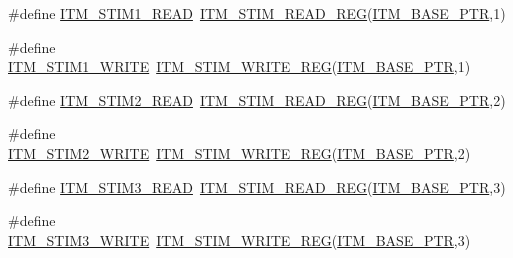 \begin{DoxyCompactItemize}
\item 
\#define \hyperlink{group___i_t_m___register___accessor___macros_ga0539c5b663891628a5157b9e06be3327}{I\+T\+M\+\_\+\+S\+T\+I\+M1\+\_\+\+R\+E\+AD}~\hyperlink{group___i_t_m___register___accessor___macros_ga5009882336aadcd4f37b45cf3395c450}{I\+T\+M\+\_\+\+S\+T\+I\+M\+\_\+\+R\+E\+A\+D\+\_\+\+R\+EG}(\hyperlink{group___i_t_m___peripheral_gafaddee8fe8b6a898d4e5edc43ee0d703}{I\+T\+M\+\_\+\+B\+A\+S\+E\+\_\+\+P\+TR},1)
\item 
\#define \hyperlink{group___i_t_m___register___accessor___macros_gadb4269a2c1aae622c11d8e38853bf0d3}{I\+T\+M\+\_\+\+S\+T\+I\+M1\+\_\+\+W\+R\+I\+TE}~\hyperlink{group___i_t_m___register___accessor___macros_ga049ca92a4e78e77c19af81e51aa73f1c}{I\+T\+M\+\_\+\+S\+T\+I\+M\+\_\+\+W\+R\+I\+T\+E\+\_\+\+R\+EG}(\hyperlink{group___i_t_m___peripheral_gafaddee8fe8b6a898d4e5edc43ee0d703}{I\+T\+M\+\_\+\+B\+A\+S\+E\+\_\+\+P\+TR},1)
\item 
\#define \hyperlink{group___i_t_m___register___accessor___macros_ga34d8d4f75c9b1761c099b65fc7b2073e}{I\+T\+M\+\_\+\+S\+T\+I\+M2\+\_\+\+R\+E\+AD}~\hyperlink{group___i_t_m___register___accessor___macros_ga5009882336aadcd4f37b45cf3395c450}{I\+T\+M\+\_\+\+S\+T\+I\+M\+\_\+\+R\+E\+A\+D\+\_\+\+R\+EG}(\hyperlink{group___i_t_m___peripheral_gafaddee8fe8b6a898d4e5edc43ee0d703}{I\+T\+M\+\_\+\+B\+A\+S\+E\+\_\+\+P\+TR},2)
\item 
\#define \hyperlink{group___i_t_m___register___accessor___macros_gaef5fd73197cf69307c400cd33e9d5c0a}{I\+T\+M\+\_\+\+S\+T\+I\+M2\+\_\+\+W\+R\+I\+TE}~\hyperlink{group___i_t_m___register___accessor___macros_ga049ca92a4e78e77c19af81e51aa73f1c}{I\+T\+M\+\_\+\+S\+T\+I\+M\+\_\+\+W\+R\+I\+T\+E\+\_\+\+R\+EG}(\hyperlink{group___i_t_m___peripheral_gafaddee8fe8b6a898d4e5edc43ee0d703}{I\+T\+M\+\_\+\+B\+A\+S\+E\+\_\+\+P\+TR},2)
\item 
\#define \hyperlink{group___i_t_m___register___accessor___macros_gac2585aa635223db51bc5dfb64d5901f0}{I\+T\+M\+\_\+\+S\+T\+I\+M3\+\_\+\+R\+E\+AD}~\hyperlink{group___i_t_m___register___accessor___macros_ga5009882336aadcd4f37b45cf3395c450}{I\+T\+M\+\_\+\+S\+T\+I\+M\+\_\+\+R\+E\+A\+D\+\_\+\+R\+EG}(\hyperlink{group___i_t_m___peripheral_gafaddee8fe8b6a898d4e5edc43ee0d703}{I\+T\+M\+\_\+\+B\+A\+S\+E\+\_\+\+P\+TR},3)
\item 
\#define \hyperlink{group___i_t_m___register___accessor___macros_ga5dd9fe046bf774394e98b8aae32f09be}{I\+T\+M\+\_\+\+S\+T\+I\+M3\+\_\+\+W\+R\+I\+TE}~\hyperlink{group___i_t_m___register___accessor___macros_ga049ca92a4e78e77c19af81e51aa73f1c}{I\+T\+M\+\_\+\+S\+T\+I\+M\+\_\+\+W\+R\+I\+T\+E\+\_\+\+R\+EG}(\hyperlink{group___i_t_m___peripheral_gafaddee8fe8b6a898d4e5edc43ee0d703}{I\+T\+M\+\_\+\+B\+A\+S\+E\+\_\+\+P\+TR},3)

\end{DoxyCompactItemize}
